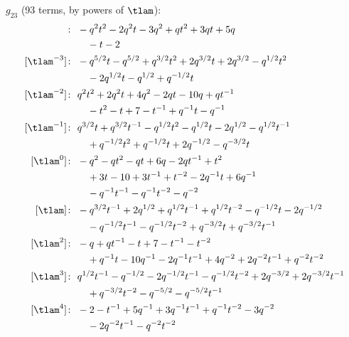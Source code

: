 $g_{23}$ (93 terms, by powers of $\tlam$):
\begin{align*}
[\tlam^{-4}]\colon\ & -q^{2} t^{2} -2 q^{2} t -3 q^{2} +q t^{2} +3 q t +5 q \\
& \quad -t -2 \\
[\tlam^{-3}]\colon\ & -q^{5/2} t -q^{5/2} +q^{3/2} t^{2} +2 q^{3/2} t +2 q^{3/2} -q^{1/2} t^{2} \\
& \quad -2 q^{1/2} t -q^{1/2} +q^{-1/2} t \\
[\tlam^{-2}]\colon\ & q^{2} t^{2} +2 q^{2} t +4 q^{2} -2 q t -10 q +q t^{-1} \\
& \quad -t^{2} -t +7 -t^{-1} +q^{-1} t -q^{-1} \\
[\tlam^{-1}]\colon\ & q^{3/2} t +q^{3/2} t^{-1} -q^{1/2} t^{2} -q^{1/2} t -2 q^{1/2} -q^{1/2} t^{-1} \\
& \quad +q^{-1/2} t^{2} +q^{-1/2} t +2 q^{-1/2} -q^{-3/2} t \\
[\tlam^{0}]\colon\ & -q^{2} -q t^{2} -q t +6 q -2 q t^{-1} +t^{2} \\
& \quad +3 t -10 +3 t^{-1} +t^{-2} -2 q^{-1} t +6 q^{-1} \\
& \quad -q^{-1} t^{-1} -q^{-1} t^{-2} -q^{-2} \\
[\tlam]\colon\ & -q^{3/2} t^{-1} +2 q^{1/2} +q^{1/2} t^{-1} +q^{1/2} t^{-2} -q^{-1/2} t -2 q^{-1/2} \\
& \quad -q^{-1/2} t^{-1} -q^{-1/2} t^{-2} +q^{-3/2} t +q^{-3/2} t^{-1} \\
[\tlam^{2}]\colon\ & -q +q t^{-1} -t +7 -t^{-1} -t^{-2} \\
& \quad +q^{-1} t -10 q^{-1} -2 q^{-1} t^{-1} +4 q^{-2} +2 q^{-2} t^{-1} +q^{-2} t^{-2} \\
[\tlam^{3}]\colon\ & q^{1/2} t^{-1} -q^{-1/2} -2 q^{-1/2} t^{-1} -q^{-1/2} t^{-2} +2 q^{-3/2} +2 q^{-3/2} t^{-1} \\
& \quad +q^{-3/2} t^{-2} -q^{-5/2} -q^{-5/2} t^{-1} \\
[\tlam^{4}]\colon\ & -2 -t^{-1} +5 q^{-1} +3 q^{-1} t^{-1} +q^{-1} t^{-2} -3 q^{-2} \\
& \quad -2 q^{-2} t^{-1} -q^{-2} t^{-2}
\end{align*}

